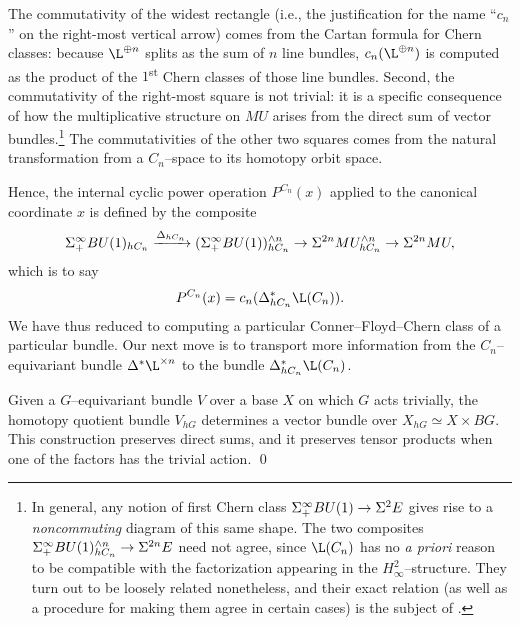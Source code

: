 The commutativity of the widest rectangle (i.e., the justification for the name ``\(c_n\)'' on the right-most vertical arrow) comes from the Cartan formula for Chern classes: because \(\L^{\oplus n}\) splits as the sum of \(n\) line bundles, \(c_n(\L^{\oplus n})\) is computed as the product of the \(1\)\textsuperscript{st} Chern classes of those line bundles.  Second, the commutativity of the right-most square is not trivial: it is a specific consequence of how the multiplicative structure on \(MU\) arises from the direct sum of vector bundles.\footnote{In general, any notion of first Chern class \(\Sigma^\infty_+ BU(1) \to \Sigma^2 E\) gives rise to a \emph{noncommuting} diagram of this same shape.  The two composites \(\Sigma^\infty_+ BU(1)^{\wedge n}_{hC_n} \to \Sigma^{2n} E\) need not agree, since \(\L(C_n)\) has no \textit{a priori} reason to be compatible with the factorization appearing in the \(H_\infty^2\)--structure.  They turn out to be loosely related nonetheless, and their exact relation (as well as a procedure for making them agree in certain cases) is the subject of .}  The commutativities of the other two squares comes from the natural transformation from a \(C_n\)--space to its homotopy orbit space.

Hence, the internal cyclic power operation \(P^{C_n}(x)\) applied to the canonical coordinate \(x\) is defined by the composite \[\Sigma^\infty_+ BU(1)_{hC_n} \xrightarrow{\Delta_{hC_n}} (\Sigma^\infty_+ BU(1))^{\wedge n}_{hC_n} \to \Sigma^{2n} MU^{\wedge n}_{hC_n} \to \Sigma^{2n} MU,\] which is to say \[P^{C_n}(x) = c_n(\Delta_{hC_n}^* \L(C_n)).\]  We have thus reduced to computing a particular Conner--Floyd--Chern class of a particular bundle.  Our next move is to transport more information from the \(C_n\)--equivariant bundle \(\Delta^* \L^{\times n}\) to the bundle \(\Delta_{hC_n}^* \L(C_n)\).

\begin{lemma}\label{GEquivBundlesVsBundlesOverBG}
Given a \(G\)--equivariant bundle \(V\) over a base \(X\) on which \(G\) acts trivially, the homotopy quotient bundle \(V_{hG}\) determines a vector bundle over \(X_{hG} \simeq X \times BG\).  This construction preserves direct sums, and it preserves tensor products when one of the factors has the trivial action. \pushQED\qed\qedhere\popQED
\end{lemma}

